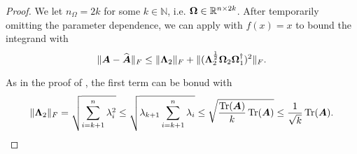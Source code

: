 \documentclass[12pt]{article}
\begin{document}
\begin{proof}
    We let $n_{\Omega} = 2k$ for some $k \in \mathbb{N}$, i.e. $\boldsymbol{\Omega} \in \mathbb{R}^{n \times 2k}$. After temporarily omitting the parameter dependence, we can apply \cite[Theorem B.1]{persson-2023-randomized-lowrank} with $f(x) = x$ to bound the integrand with 
    \begin{equation}
        \lVert \boldsymbol{A} - \widehat{\boldsymbol{A}} \rVert _F 
        \leq  \lVert \boldsymbol{\Lambda}_2 \rVert _F + \lVert (\boldsymbol{\Lambda}_2^{\frac{1}{2}} \boldsymbol{\Omega}_2 \boldsymbol{\Omega}_1^{\dagger} )^2 \rVert _F.
        \label{equ:nystrom-proof-persson-bonud}
    \end{equation}
    
    As in the proof of \cite[Lemma 3]{meyer-2021-hutch-optimal}, the first term can be bonud with
    \begin{equation}
        \lVert \boldsymbol{\Lambda}_2 \rVert _F
        = \sqrt{\sum_{i=k+1}^{n} \lambda_i^2}
        \leq \sqrt{ \lambda_{k+1} \sum_{i=k+1}^{n} \lambda_i}
        \leq \sqrt{ \frac{\operatorname{Tr}(\boldsymbol{A})}{k} \operatorname{Tr}(\boldsymbol{A})}
        \leq \frac{1}{\sqrt{k}} \operatorname{Tr}(\boldsymbol{A}).
        \label{equ:nystrom-proof-frobenius-trace}
    \end{equation}


\end{proof}
\end{document}
